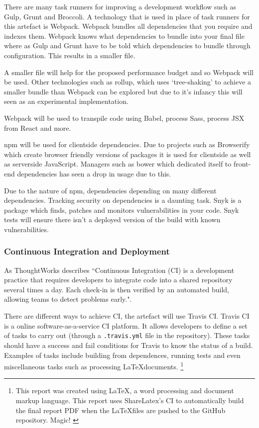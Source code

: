 There are many task runners for improving a development workflow such as Gulp, Grunt and Broccoli. A technology that is used in place of task runners for this artefact is Webpack. Webpack bundles all dependencies that you require and indexes them. Webpack knows what dependencies to bundle into your final file where as Gulp and Grunt have to be told which dependencies to bundle through configuration. This results in a smaller file. \cite{webpack}

A smaller file will help for the proposed performance budget and so Webpack will be used. Other technologies such as rollup, which uses `tree-shaking' to achieve a smaller bundle than Webpack can be explored but due to it's infancy this will seen as an experimental implementation. \cite{rollup}

Webpack will be used to transpile code using Babel, process Sass, process JSX from React and more.

npm will be used for clientside dependencies. Due to projects such as Browserify which create browser friendly versions of packages it is used for clientside as well as serverside JavaScript. \cite{browserify} Managers such as bower which dedicated itself to front-end dependencies has seen a drop in usage due to this. \cite{bower}

Due to the nature of npm, dependencies depending on many different dependencies. Tracking security on dependencies is a daunting task. Snyk is a package which finds, patches and monitors vulnerabilities in your code. \cite{snyk} Snyk tests will ensure there isn't a deployed version of the build with known vulnerabilities.

\subsubsection{Continuous Integration and Deployment} \label{a-d--continuous-integration}

As ThoughtWorks describes ``Continuous Integration (CI) is a development practice that requires developers to integrate code into a shared repository several times a day. Each check-in is then verified by an automated build, allowing teams to detect problems early.". \cite{continuous_integration}

There are different ways to achieve CI, the artefact will use Travis CI. Travis CI is a online software-as-a-service CI platform. It allows developers to define a set of tasks to carry out (through a \verb|.travis.yml| file in the repository). These tasks should have a success and fail conditions for Travis to know the status of a build. Examples of tasks include building from dependences, running tests and even miscellaneous tasks such as processing \LaTeX documents. \footnote{This report was created using \LaTeX, a word processing and document markup language. \cite{latex} This report uses ShareLatex's CI to automatically build the final report PDF when the \LaTeX files are pushed to the GitHub repository. Magic! \cite{sharelatex}}

